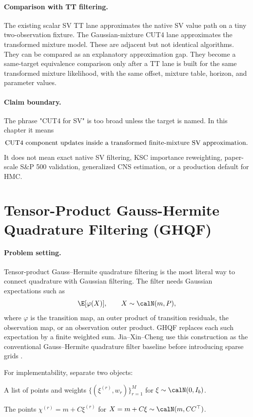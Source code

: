 \paragraph{Comparison with TT filtering.}
The existing scalar SV TT lane approximates the native SV value path on a tiny
two-observation fixture.  The Gaussian-mixture CUT4 lane approximates the
transformed mixture model.  These are adjacent but not identical algorithms.
They can be compared as an explanatory approximation gap.  They become a
same-target equivalence comparison only after a TT lane is built for the same
transformed mixture likelihood, with the same offset, mixture table, horizon,
and parameter values.

\paragraph{Claim boundary.}
The phrase "CUT4 for SV" is too broad unless the target is named.  In this
chapter it means
\[
  \hbox{CUT4 component updates inside a transformed finite-mixture SV
  approximation.}
\]
It does not mean exact native SV filtering, KSC importance reweighting,
paper-scale S\&P 500 validation, generalized CNS estimation, or a production
default for HMC.

\section{Tensor-Product Gauss-Hermite Quadrature Filtering (GHQF)}
\label{sec:bf-hd-tensor-product-ghq}

\paragraph{Problem setting.}
Tensor-product Gauss--Hermite quadrature filtering is the most literal way to
connect quadrature with Gaussian filtering.  The filter needs Gaussian
expectations such as
\[
  \E[\varphi(X)],\qquad X\sim\calN(m,P),
\]
where \(\varphi\) is the transition map, an outer product of transition
residuals, the observation map, or an observation outer product.  GHQF replaces
each such expectation by a finite weighted sum.  Jia--Xin--Cheng use this
construction as the conventional Gauss--Hermite quadrature filter baseline
before introducing sparse grids \citep[Section 2.2.1]{jia2012sparsegrid}.

For implementability, separate two objects:

\begin{description}[leftmargin=0.25in]
  \item[Standardized rule.] A list of points and weights
  \(\{(\xi^{(r)},w_r)\}_{r=1}^M\) for
  \(\xi\sim\calN(0,I_b)\).
  \item[Placed rule.] The points \(\chi^{(r)}=m+C\xi^{(r)}\) for
  \(X=m+C\xi\sim\calN(m,CC^\top)\).
\end{description}

